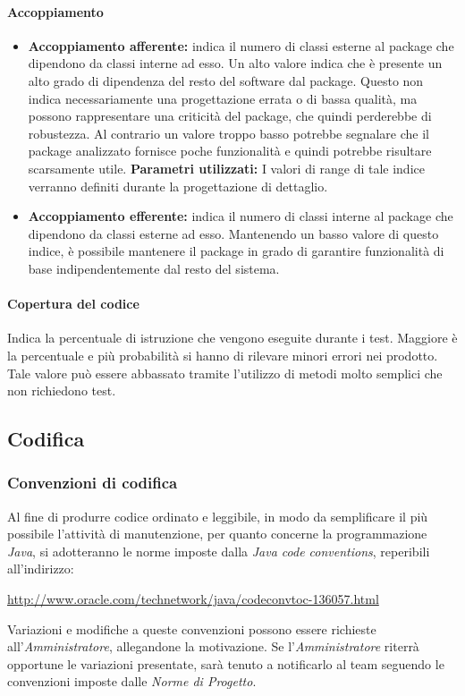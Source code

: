\paragraph{Accoppiamento}
\begin{itemize}
\item \textbf{Accoppiamento afferente:} indica il numero di classi esterne al package che dipendono da classi interne ad esso. Un alto valore indica che è presente un alto grado di dipendenza del resto del software dal package. Questo non indica necessariamente una progettazione errata o di bassa qualità, ma possono rappresentare una criticità del package, che quindi perderebbe di robustezza. Al contrario un valore troppo basso potrebbe segnalare che il package analizzato fornisce poche funzionalità e quindi potrebbe risultare scarsamente utile.
\textbf{Parametri utilizzati:}
I valori di range di tale indice verranno definiti durante la progettazione di dettaglio.
\item \textbf{Accoppiamento efferente:} indica il numero di classi interne al package che dipendono da classi esterne ad esso. Mantenendo un basso valore di questo indice, è possibile mantenere il package in grado di garantire funzionalità di base indipendentemente dal resto del sistema.
\end{itemize}
\paragraph{Copertura del codice}
Indica la percentuale di istruzione che vengono eseguite durante i test. Maggiore è la percentuale e più probabilità si hanno di rilevare minori errori nei prodotto. Tale valore può essere abbassato tramite l'utilizzo di metodi molto semplici che non richiedono test.\\

\subsection{Codifica}
\subsubsection{Convenzioni di codifica}
Al fine di produrre codice ordinato e leggibile, in modo da semplificare il più possibile l'attività di manutenzione, per quanto concerne la programmazione \textit{Java}, si adotteranno le norme imposte dalla \textit{Java code conventions}, reperibili all'indirizzo:
\begin{center}
\href{http://www.oracle.com/technetwork/java/codeconvtoc-136057.html}{http://www.oracle.com/technetwork/java/codeconvtoc-136057.html}
\end{center}
Variazioni e modifiche a queste convenzioni possono essere richieste all'\textit{Amministratore}, allegandone la motivazione.
Se l'\textit{Amministratore} riterrà opportune le variazioni presentate, sarà tenuto a notificarlo al team seguendo le convenzioni imposte dalle \textit{Norme di Progetto}.

